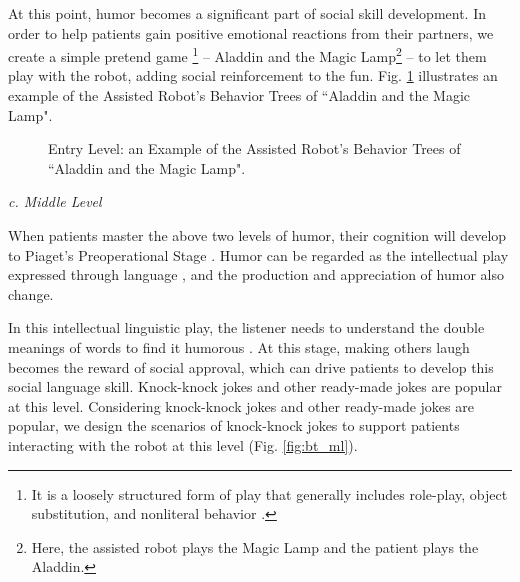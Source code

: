 \documentclass[letterpaper]{article} %
\begin{document}
At this point, humor becomes a significant part of social skill development. In order to help patients gain positive emotional reactions from their partners, we create a simple pretend game \footnote{It is a loosely structured form of play that generally includes role-play, object substitution, and nonliteral behavior \cite{fein1981pretend}.} -- Aladdin and the Magic Lamp\footnote{Here, the assisted robot plays the Magic Lamp and the patient plays the Aladdin.} -- to let them play with the robot, adding social reinforcement to the fun. Fig. \ref{fig:bt_bl} illustrates an example of the Assisted Robot's Behavior Trees of ``Aladdin and the Magic Lamp".

\begin{figure}
\centering
{}
 \caption{Entry Level: an Example of the Assisted Robot's Behavior Trees of ``Aladdin and the Magic Lamp".}
 \label{fig:bt_bl}
 \end{figure}


\textit{c. Middle Level}

When patients master the above two levels of humor, their cognition will develop to Piaget’s Preoperational Stage \cite{papalia2007human}. Humor can be regarded as the intellectual play expressed through language \cite{freud1960jokes}, and the production and appreciation of humor also change.

In this intellectual linguistic play, the listener needs to understand the double meanings of words to find it humorous \cite{southam2005humor}. At this stage, making others laugh becomes the reward of social approval, which can drive patients to develop this social language skill. Knock-knock jokes and other ready-made jokes are popular at this level. Considering knock-knock jokes and other ready-made jokes are popular, we design the scenarios of knock-knock jokes to support patients interacting with the robot at this level (Fig. \ref{fig:bt_ml}).
\end{document}
